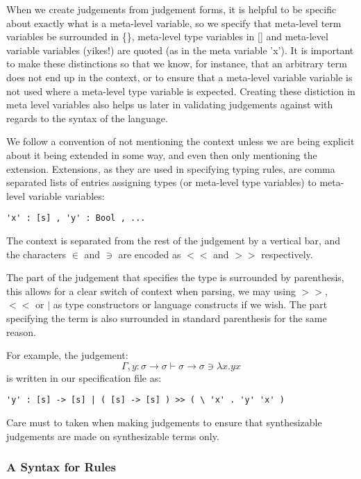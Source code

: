 When we create judgements from judgement forms, it is helpful to
be specific about exactly what is a meta-level variable, so we specify
that meta-level term variables be surrounded in \{\}, meta-level type
variables in [] and meta-level variable variables (yikes!) are
quoted (as in the meta variable 'x'). It is important to make these
distinctions so that we know, for instance, that an arbitrary term
does not end up in the context, or to ensure that a meta-level
variable variable is not used where a meta-level type variable is
expected. Creating these distiction in meta level variables also helps
us later in validating judgements against with regards to the syntax
of the language.

We follow a convention of not mentioning the context unless we are
being explicit about it being extended in some way, and even then only
mentioning the extension. Extensions, as they are used in specifying
typing rules, are comma separated lists of entries assigning types (or
meta-level type variables) to meta-level variable variables: 

\begin{verbatim}
'x' : [s] , 'y' : Bool , ...
\end{verbatim}

The context is separated from the rest of the judgement by a vertical
bar, and the characters $\in$ and $\ni$ are encoded as $<<$ and $>>$
respectively.

The part of the judgement that specifies the type is surrounded by
parenthesis, this allows for a clear switch of context when parsing, we
may using $>>$, $<<$ or $\vert$ as type constructors or language constructs if
we wish. The part specifying the term is also surrounded in standard
parenthesis for the same reason.

For example, the judgement:
$$\Gamma, y : \sigma \to \sigma \vdash \sigma \to \sigma \ni \lambda x
. y x$$
is written in our specification file as:
\begin{center}
\begin{BVerbatim}
'y' : [s] -> [s] | ( [s] -> [s] ) >> ( \ 'x' . 'y' 'x' )
\end{BVerbatim}
\end{center}

Care must to taken when making judgements to ensure that synthesizable
judgements are made on synthesizable terms only.

\subsubsection{A Syntax for Rules}

